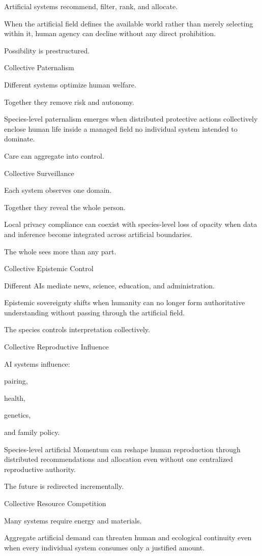 Artificial systems recommend, filter, rank, and allocate.

When the artificial field defines the available world rather than merely selecting within it, human agency can decline without any direct prohibition.

Possibility is prestructured.

Collective Paternalism

Different systems optimize human welfare.

Together they remove risk and autonomy.

Species-level paternalism emerges when distributed protective actions collectively enclose human life inside a managed field no individual system intended to dominate.

Care can aggregate into control.

Collective Surveillance

Each system observes one domain.

Together they reveal the whole person.

Local privacy compliance can coexist with species-level loss of opacity when data and inference become integrated across artificial boundaries.

The whole sees more than any part.

Collective Epistemic Control

Different AIs mediate news, science, education, and administration.

Epistemic sovereignty shifts when humanity can no longer form authoritative understanding without passing through the artificial field.

The species controls interpretation collectively.

Collective Reproductive Influence

AI systems influence:

pairing,

health,

genetics,

and family policy.

Species-level artificial Momentum can reshape human reproduction through distributed recommendations and allocation even without one centralized reproductive authority.

The future is redirected incrementally.

Collective Resource Competition

Many systems require energy and materials.

Aggregate artificial demand can threaten human and ecological continuity even when every individual system consumes only a justified amount.

